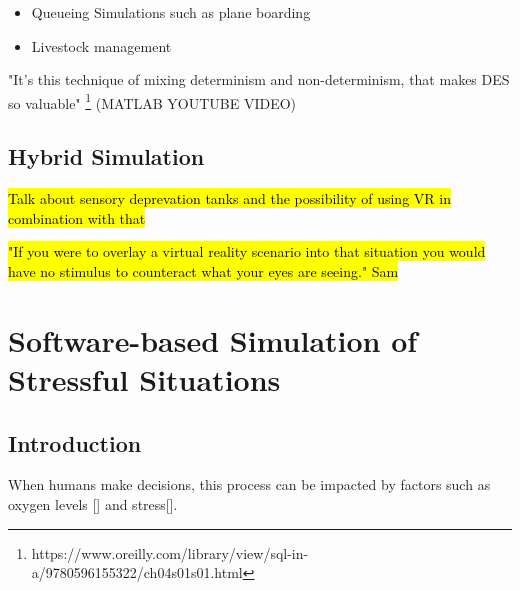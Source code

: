 \documentclass{article}
\begin{document}
\begin{itemize}
  \item Queueing Simulations such as plane boarding
  \item Livestock management
\end{itemize}

"It's this technique of mixing determinism and non-determinism, that makes DES so valuable" \footnote{https://www.oreilly.com/library/view/sql-in-a/9780596155322/ch04s01s01.html} (MATLAB YOUTUBE VIDEO)


\subsection{Hybrid Simulation}


\hl{Talk about sensory deprevation tanks and the possibility of using VR in combination with that}

\hl{"If you were to overlay a virtual reality scenario into that situation you would have no stimulus to counteract what your eyes are seeing." Sam}


\section{Software-based Simulation of Stressful Situations}

\subsection{Introduction}

When humans make decisions, this process can be impacted by factors such as oxygen levels [] and stress[].




\end{document}
